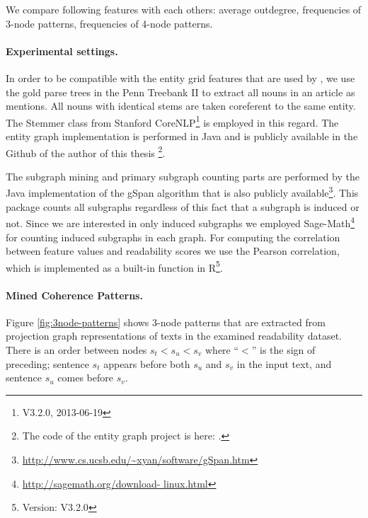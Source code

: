 We compare following features with each others: average outdegree, frequencies of 3-node patterns, frequencies of 4-node patterns. 

\paragraph{Experimental settings.} 
In order to be compatible with the entity grid features that are used by , we use the gold parse trees in the Penn Treebank II \cite{marcus94} to extract all nouns in an article as mentions. 
All nouns with identical stems are taken coreferent to the same entity. 
The Stemmer class from Stanford CoreNLP\footnote{V3.2.0, 2013-06-19} is employed in this regard.  
The entity graph implementation is performed in Java and is publicly available in the Github of the author of this thesis
\footnote{The code of the entity graph project is here: \url{}.}. 

The subgraph mining and primary subgraph counting parts are performed by the Java implementation of the gSpan algorithm that is also publicly available\footnote{\url{http://www.cs.ucsb.edu/~xyan/software/gSpan.htm}}. 
This package counts all subgraphs regardless of this fact that a subgraph is induced or not. 
Since we are interested in only induced subgraphs we employed Sage-Math\footnote{\url{http://sagemath.org/download- linux.html}} for counting induced subgraphs in each graph.  
For computing the correlation between feature values and readability scores we use the Pearson correlation, which is implemented as a built-in function in R\footnote{Version: V3.2.0}. 

\paragraph{Mined Coherence Patterns.} 
Figure \ref{fig:3node-patterns} shows 3-node patterns that are extracted from projection graph representations of texts in the examined readability dataset. 
There is an order between nodes $s_t < s_u < s_v$ where ``$<$'' is the sign of preceding; sentence $s_t$ appears before both $s_u$ and $s_v$ in the input text, and sentence $s_u$ comes before $s_v$. 

